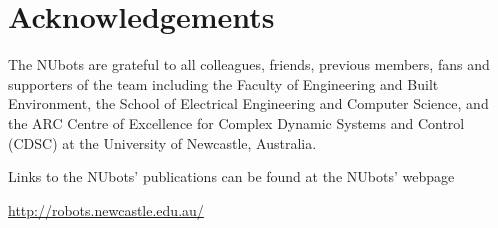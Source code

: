 
\section{Acknowledgements}
 \noindent The NUbots are grateful to all colleagues, friends, previous members, fans and supporters of the team including  the Faculty of Engineering and Built Environment, the School of Electrical Engineering and Computer Science, and the ARC Centre of Excellence for Complex Dynamic Systems and Control (CDSC) at the University of Newcastle, Australia.

\noindent Links to the NUbots' publications can be found at the NUbots' webpage
\begin{center}
\url{http://robots.newcastle.edu.au/}
\end{center}

